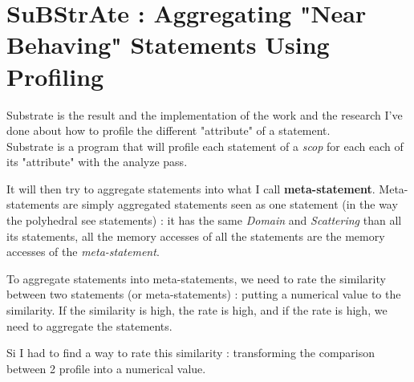 \documentclass[paper=a4, fontsize=11.5pt]{scrartcl}
\numberwithin{equation}{section}        %
\numberwithin{figure}{section}          %
\numberwithin{table}{section}               %
\begin{document}
\section{SuBStrAte : Aggregating "Near Behaving" Statements Using Profiling}
    Substrate is the result and the implementation of the work and the research I've done
    about how to profile the different "attribute" of a statement.\\
    Substrate is a program that will profile each statement of a \textit{scop} for
    each each of its "attribute" with the analyze pass.

    It will then try to aggregate
    statements into what I call \textbf{meta-statement}. Meta-statements are simply
    aggregated statements seen as one statement (in the way the polyhedral see statements)
    : it has the same \textit{Domain} and \textit{Scattering} than all its statements,
    all the memory accesses of all the statements are the memory accesses of the \textit{meta-statement}.

    To aggregate statements into meta-statements, we need to rate the similarity between two
    statements (or meta-statements) : putting a numerical value to the similarity.
    If the similarity is high, the rate is high, and if the rate is high, we need to
    aggregate the statements.

    Si I had to find a way to rate this similarity : transforming the comparison between
    2 profile into a numerical value.
\end{document}
